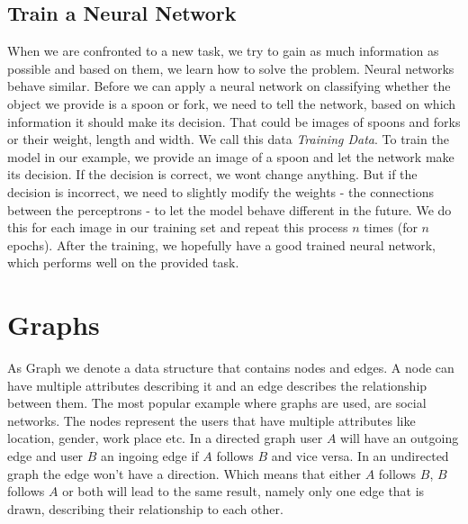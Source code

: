     \subsection{Train a Neural Network}

      When we are confronted to a new task, we try to gain as much information as possible and based on them, we learn how to solve the problem.
      Neural networks behave similar.
      Before we can apply a neural network on classifying whether the object we provide is a spoon or fork, we need to tell the network, based on which information it should make its decision.
      That could be images of spoons and forks or their weight, length and width.
      We call this data \emph{Training Data}.
      To train the model in our example, we provide an image of a spoon and let the network make its decision.
      If the decision is correct, we wont change anything.
      But if the decision is incorrect, we need to slightly modify the weights - the connections between the perceptrons - to let the model behave different in the future.
      We do this for each image in our training set and repeat this process $n$ times (for $n$ epochs).
      After the training, we hopefully have a good trained neural network, which performs well on the provided task.

	\section{Graphs}

		As Graph we denote a data structure that contains nodes and edges. 
    A node can have multiple attributes describing it and an edge describes the relationship between them. 
    The most popular example where graphs are used, are social networks. The nodes represent the users that have multiple attributes like location, gender, work place etc. 
    In a directed graph user $A$ will have an outgoing edge and user $B$ an ingoing edge if $A$ follows $B$ and vice versa. In an undirected graph the edge won't have a direction. 
    Which means that either $A$ follows $B$, $B$ follows $A$ or both will lead to the same result, namely only one edge that is drawn, describing their relationship to each other.

